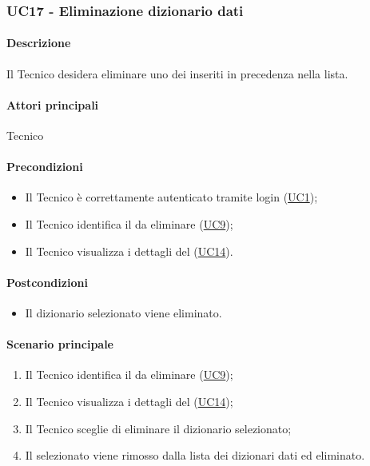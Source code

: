 \subsubsection{UC17 - Eliminazione dizionario dati}\label{UC17}
\paragraph*{Descrizione}
Il Tecnico desidera eliminare uno dei  inseriti in precedenza nella lista.

\paragraph*{Attori principali}
Tecnico

\paragraph*{Precondizioni}
\begin{itemize}
  \item Il Tecnico è correttamente autenticato tramite login (\hyperref[UC1]{UC1});
  \item Il Tecnico identifica il  da eliminare (\hyperref[UC9]{UC9});
  \item Il Tecnico visualizza i dettagli del  (\hyperref[UC14]{UC14}).  
\end{itemize}

\paragraph*{Postcondizioni}
\begin{itemize}
  \item Il dizionario selezionato viene eliminato.
\end{itemize}

\paragraph*{Scenario principale}
\begin{enumerate}
  \item Il Tecnico identifica il  da eliminare (\hyperref[UC9]{UC9});
  \item Il Tecnico visualizza i dettagli del  (\hyperref[UC14]{UC14});  
  \item Il Tecnico sceglie di eliminare il dizionario selezionato;
  \item Il  selezionato viene rimosso dalla lista dei dizionari dati ed eliminato.  
\end{enumerate}

